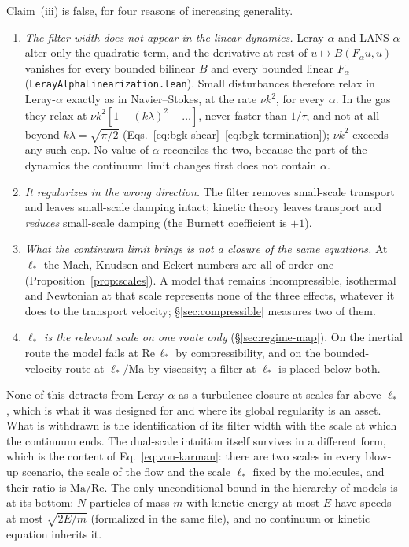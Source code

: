 \documentclass[11pt,a4paper]{article}
\begin{document}
Claim~(iii) is false, for four reasons of increasing generality.
\begin{enumerate}
\item \emph{The filter width does not appear in the linear dynamics.} Leray-$\alpha$ and
  LANS-$\alpha$ alter only the quadratic term, and the derivative at rest of $u\mapsto
  B(F_\alpha u,u)$ vanishes for every bounded bilinear $B$ and every bounded linear $F_\alpha$
  (\texttt{LerayAlphaLinearization.lean}). Small disturbances therefore relax in Leray-$\alpha$
  exactly as in Navier--Stokes, at the rate $\nu k^2$, for every $\alpha$. In the gas they relax at
  $\nu k^2[1-(k\lambda)^2+\dots]$, never faster than $1/\tau$, and not at all beyond
  $k\lambda=\sqrt{\pi/2}$ (Eqs.~\ref{eq:bgk-shear}--\ref{eq:bgk-termination}); $\nu k^2$ exceeds
  any such cap. No value of $\alpha$ reconciles the two, because the part of the dynamics the
  continuum limit changes first does not contain $\alpha$.
\item \emph{It regularizes in the wrong direction.} The filter removes small-scale transport and
  leaves small-scale damping intact; kinetic theory leaves transport and \emph{reduces} small-scale
  damping (the Burnett coefficient is $+1$).
\item \emph{What the continuum limit brings is not a closure of the same equations.} At $\ell_*$ the
  Mach, Knudsen and Eckert numbers are all of order one (Proposition~\ref{prop:scales}). A model
  that remains incompressible, isothermal and Newtonian at that scale represents none of the three
  effects, whatever it does to the transport velocity; \S\ref{sec:compressible} measures two of them.
\item \emph{$\ell_*$ is the relevant scale on one route only} (\S\ref{sec:regime-map}). On the
  inertial route the model fails at $\mathrm{Re}\,\ell_*$ by compressibility, and on the
  bounded-velocity route at $\ell_*/\mathrm{Ma}$ by viscosity; a filter at $\ell_*$ is placed
  below both.
\end{enumerate}
None of this detracts from Leray-$\alpha$ as a turbulence closure at scales far above $\ell_*$, which
is what it was designed for and where its global regularity is an asset. What is withdrawn is the
identification of its filter width with the scale at which the continuum ends. The dual-scale
intuition itself survives in a different form, which is the content of
Eq.~\eqref{eq:von-karman}: there are two scales in every blow-up scenario, the scale of the flow and
the scale $\ell_*$ fixed by the molecules, and their ratio is $\mathrm{Ma}/\mathrm{Re}$. The only
unconditional bound in the hierarchy of models is at its bottom: $N$ particles of mass $m$ with
kinetic energy at most $E$ have speeds at most $\sqrt{2E/m}$ (formalized in the same file), and no
continuum or kinetic equation inherits it.
\end{document}
